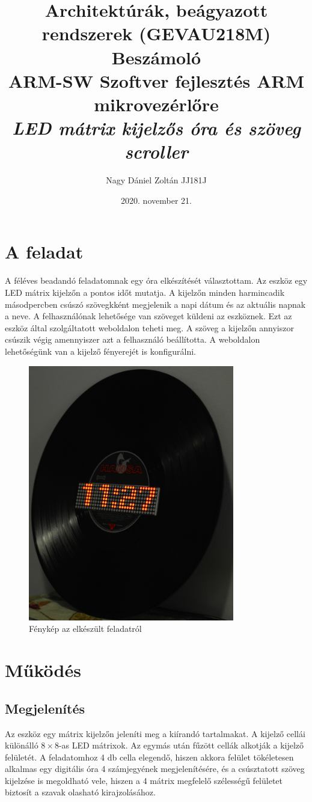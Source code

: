 \documentclass[a4paper, 12pt]{article}
\title{Architektúrák, beágyazott rendszerek (GEVAU218M)\\\LARGE{\textbf{Beszámoló}}\\ \medskip \large{\textbf{ARM-SW} Szoftver fejlesztés ARM mikrovezérlőre} \\ \bigskip \LARGE{\textit{LED mátrix kijelzős óra és szöveg scroller}}}
\date{2020. november 21.}
\author{Nagy Dániel Zoltán JJ181J}
\begin{document}
\maketitle

\section{A feladat}
A féléves beadandó feladatomnak egy óra elkészítését választottam.
Az eszköz egy LED mátrix kijelzőn a pontos időt mutatja. A kijelzőn minden harmincadik másodpercben csúszó szövegkként megjelenik a napi dátum és az aktuális napnak a neve. A felhasználónak lehetősége van szöveget küldeni az eszköznek. Ezt az eszköz által szolgáltatott weboldalon teheti meg. A szöveg a kijelzőn annyiszor csúszik végig amennyiszer azt a felhasználó beállította. A weboldalon lehetőségünk van a kijelző fényerejét is konfigurálni.

\begin{figure}[ht]
	\centering
	\includegraphics[width = 9cm]{images/vinyl_clock.JPG}
	\caption{Fénykép az elkészült feladatról}
	\label{fig:product}
\end{figure}	

\section{Működés}

\subsection{Megjelenítés}
Az eszköz egy mátrix kijelzőn jeleníti meg a kiírandó tartalmakat. A kijelző cellái különálló $8\times 8$-as LED mátrixok. Az egymás után fűzött cellák alkotják a kijelző felületét. A feladatomhoz 4 db cella elegendő, hiszen akkora felület tökéletesen alkalmas egy digitális óra 4 számjegyének megjelenítésére, és a csúsztatott szöveg kijelzése is megoldható vele, hiszen a 4 mátrix megfelelő szélességű felületet biztosít a szavak olasható kirajzolásához.
\end{document}

